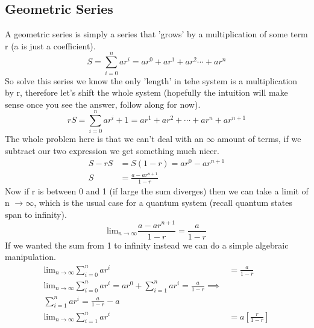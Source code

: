 \documentclass{article}
\begin{document}
 \subsection*{Geometric Series}
 A geometric series is simply a series that 'grows' by a multiplication of some term r (a is just a coefficient).
 \begin{equation}
  S = \sum_{i=0}^n ar^i = ar^0 + ar^1 + ar^2 \cdots + ar^n
 \end{equation}
So solve this series we know the only 'length' in tehe system is a multiplication by r, therefore let's shift the whole system (hopefully the intuition will make sense once you see the answer, follow along for now). 
\begin{equation}
   rS = \sum_{i=0}^n ar^i+1 = ar^1 + ar^2 + \cdots + ar^n + ar^{n+1}
\end{equation}
The whole problem here is that we can't deal with an $\infty$ amount of terms, if we subtract our two expression we get something much nicer. 
 \begin{equation}
 \begin{split}
  S - rS &= S(1-r) =   ar^0 - ar^{n+1} \\
  S &= \frac{a - ar^{n+1}}{1-r}
  \end{split}
 \end{equation}
 Now if r is between 0 and 1 (if large the sum diverges) then we can take a limit of n $\rightarrow \infty$, which is the usual case for a quantum system (recall quantum states span to infinity). 
 \begin{equation}
    \text{lim}_{n\rightarrow \infty} \frac{a - ar^{n+1}}{1-r} = \frac{a}{1-r}
 \end{equation}
If we wanted the sum from 1 to infinity instead we can do a simple algebraic manipulation. 
\begin{equation} 
\begin{split}
    \text{lim}_{n\rightarrow \infty} \sum_{i=0}^n ar^i &= \frac{a}{1-r}\\
     \text{lim}_{n\rightarrow \infty} \sum_{i=0}^n ar^i = ar^0 + \sum_{i=1}^n ar^i = \frac{a}{1-r} \implies \\
     \sum_{i=1}^n ar^i = \frac{a}{1-r}  - a \\
      \text{lim}_{n\rightarrow \infty} \sum_{i=1}^n ar^i &= a \left[ \frac{r}{1-r} \right]
    \end{split}
\end{equation}
\end{document}

